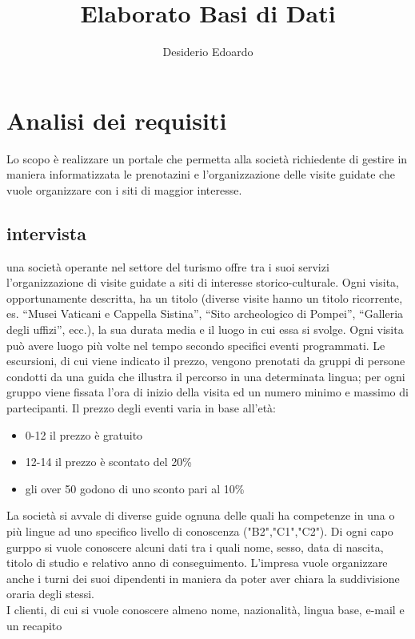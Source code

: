 \documentclass[a4paper,12pt]{report}
\title{Elaborato Basi di Dati}
\author{Desiderio Edoardo}
\begin{document}
\maketitle
\titlepage
\tableofcontents
\newpage

\chapter{Analisi dei requisiti}
Lo scopo è realizzare un portale che permetta alla società richiedente di gestire in maniera informatizzata le prenotazini e l'organizzazione
delle visite guidate che vuole organizzare con i siti di maggior interesse.
\section{intervista}
una	 società	 operante	 nel	 settore	 del	 turismo	 offre	 tra	 i	 suoi	 servizi	 l’organizzazione	 di	 	 visite	
guidate	a	siti	di	interesse	storico-culturale.
Ogni	visita,	opportunamente	descritta,	ha	un	 titolo	 (diverse	visite	hanno	un	 titolo	 ricorrente,	es.	
“Musei	Vaticani	e	Cappella	Sistina”,	“Sito	archeologico	di	Pompei”,	“Galleria	degli	uffizi”,	ecc.),	la	
sua	durata	media		e	il	luogo		in	cui	essa	si	svolge.	Ogni	visita	può	avere	luogo	più	volte	nel	tempo	
secondo	specifici	eventi	programmati.
Le escursioni,	di	cui	viene	indicato	il	prezzo,	vengono	prenotati	da	gruppi	di	persone	condotti	da	una	
guida	che	illustra	il	percorso	in	una	determinata	lingua;	per	ogni	gruppo	viene	fissata	l’ora	di	inizio	
della	visita	ed	un	numero	minimo	e	massimo	di	partecipanti.
Il prezzo degli eventi varia in base all'età:
\begin{itemize}
    \item 0-12 il prezzo è gratuito 
    \item 12-14 il prezzo è scontato del 20\%
    \item gli over 50 godono di uno sconto pari al 10\%
\end{itemize}
La	società	si	avvale	di	diverse	guide	ognuna	delle	quali	ha	competenze	in	una	o	più	lingue	ad	uno	
specifico	 livello	 di	 conoscenza	 ("B2","C1","C2"). Di	 ogni	 capo gurppo	 si	 vuole	
conoscere	 alcuni	 dati	 tra	 i	 quali	 nome,	 sesso,	 data	 di	 nascita,	 titolo	 di	 studio	 e	 relativo	 anno	 di	
conseguimento.
L'impresa vuole organizzare anche i turni dei suoi dipendenti in maniera da poter aver chiara la suddivisione oraria degli stessi.\\
I	clienti,	di	cui	si	vuole	conoscere	almeno	nome,	nazionalità,	lingua	base,	e-mail	e	un	 recapito	
\end{document}
